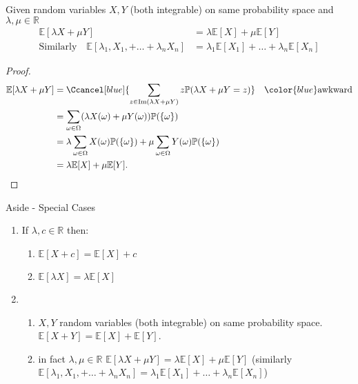 \begin{proposition}
    Given random variables $X, Y$ (both integrable) on same probability space and $\lambda, \mu \in \mathbb{R}$
    \begin{align*}
        \mathbb{E}[\lambda X + \mu Y] &= \lambda \mathbb{E}[X] + \mu \mathbb{E}[Y] \\
        \text{Similarly} \quad \mathbb{E}[\lambda_1, X_1, + \dots + \lambda_n X_n] &= \lambda_1 \mathbb{E}[X_1] + \dots + \lambda_n \mathbb{E}[X_n]
    \end{align*} 
\end{proposition} 

\begin{proof}
    \begin{align*}
        \mathbb{E}[\lambda X + \mu Y] &= \Ccancel[blue]{\sum_{z \in \operatorname{Im}(\lambda X + \mu Y)} z \mathbb{P}(\lambda X + \mu Y = z)} \quad \color{blue} \text{awkward} \\
        &= \sum_{\omega \in \Omega} (\lambda X(\omega) + \mu Y(\omega)) \mathbb{P}(\{\omega\}) \\
        &= \lambda \sum_{\omega \in \Omega} X(\omega) \mathbb{P}(\{\omega\}) + \mu \sum_{\omega \in \Omega} Y(\omega) \mathbb{P}(\{\omega\}) \\
        &= \lambda \mathbb{E}[X] + \mu \mathbb{E}[Y].
    \end{align*} 
\end{proof} 

\begin{aside}{Aside - Special Cases}
    \begin{enumerate}
        \item If $\lambda, c \in \mathbb{R}$ then:
        \begin{enumerate}
            \item $\mathbb{E}[X + c] = \mathbb{E}[X] + c$
            \item $\mathbb{E}[\lambda X] = \lambda \mathbb{E}[X]$
        \end{enumerate} 
        \item \begin{enumerate}
            \item $X, Y$ random variables (both integrable) on same probability space.
            $\mathbb{E}[X + Y] = \mathbb{E}[X] + \mathbb{E}[Y]$.
            \item in fact $\lambda, \mu \in \mathbb{R}$ $\mathbb{E}[\lambda X + \mu Y] = \lambda \mathbb{E}[X] + \mu \mathbb{E}[Y]$ (similarly $\mathbb{E}[\lambda_1, X_1, + \dots + \lambda_n X_n] = \lambda_1 \mathbb{E}[X_1] + \dots + \lambda_n \mathbb{E}[X_n]$)
        \end{enumerate} 
    \end{enumerate} 
\end{aside} 
